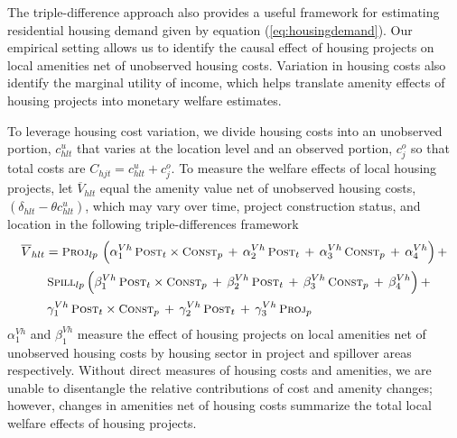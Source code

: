 \documentclass[12pt]{article}
\begin{document}
The triple-difference approach also provides a useful framework for estimating residential housing demand given by equation (\ref{eq:housingdemand}).  Our empirical setting allows us to identify the causal effect of housing projects on local amenities net of unobserved housing costs.  Variation in housing costs also identify the marginal utility of income, which helps translate amenity effects of housing projects into monetary welfare estimates.

To leverage housing cost variation, we divide housing costs into an unobserved portion, $c^{u}_{hlt}$ that varies at the location level and an observed portion, $c^{o}_{j}$ so that total costs are $C_{hjt} = c^{u}_{hlt} + c^{o}_{j}$.  To measure the welfare effects of local housing projects, let $ \overline{V}_{hlt}$ equal the amenity value net of unobserved housing costs, $(\delta_{hlt}- \theta c^{u}_{hlt} )$, which may vary over time, project construction status, and location in the following triple-differences framework
\begin{align*}
 \overline{V}_{hlt} &=  \textsc{\small Proj}_{lp} \,\, \Big( \alpha^{Vh}_1 \, \textsc{\small Post}_{t}\times\textsc{\small Const}_{p} \, + \, \alpha^{Vh}_2 \, \textsc{\small Post}_{t} \, + \, \alpha^{Vh}_3 \, \textsc{\small Const}_{p}\, +\, \alpha^{Vh}_4 \Big) \, + \\[.2em]
& \, \textsc{\small Spill}_{lp} \, \Big( \beta^{Vh}_1 \, \textsc{\small Post}_{t}\times\textsc{\small Const}_{p} \, + \, \beta^{Vh}_2 \, \textsc{\small Post}_{t} \, + \, \beta^{Vh}_3 \, \textsc{\small Const}_{p} \, +\, \beta^{Vh}_4 \Big) \, + \\[.2em]
& \, \gamma^{Vh}_1 \,  \textsc{\small Post}_{t}\times\textsc{\small Const}_{p} \, + \, \gamma^{Vh}_2 \,\textsc{\small Post}_{t} \, + \, \gamma^{Vh}_3 \,  \textsc{\small Proj}_{p}
\end{align*}
$\alpha^{Vh}_1$ and $\beta^{Vh}_1$ measure the effect of housing projects on local amenities net of unobserved housing costs by housing sector in project and spillover areas respectively.  Without direct measures of housing costs and amenities, we are unable to disentangle the relative contributions of cost and amenity changes; however, changes in amenities net of housing costs summarize the total local welfare effects of housing projects. 
\end{document}
